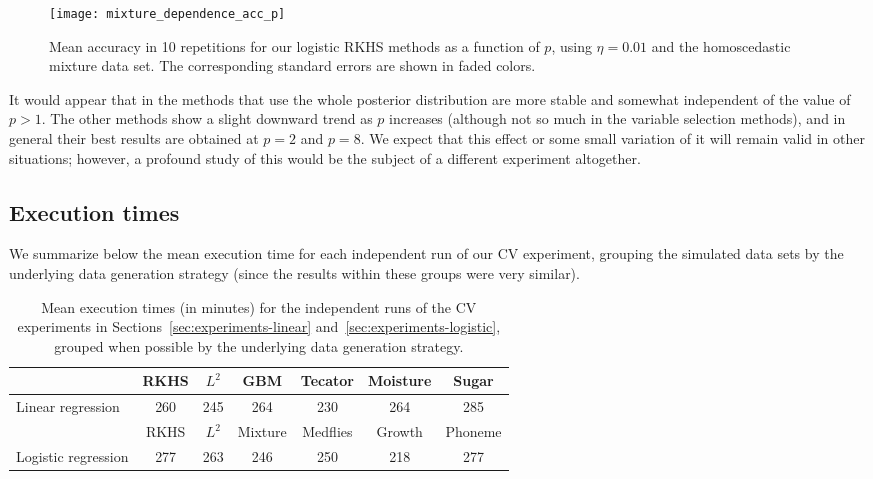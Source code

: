 \begin{figure}[ht!]
  \centering
  \texttt{[image: mixture\_dependence\_acc\_p]}
  \caption{Mean accuracy in 10 repetitions for our logistic RKHS methods as a function of \(p\), using \(\eta=0.01\) and the homoscedastic mixture data set. The corresponding standard errors are shown in faded colors.}\label{fig:dependence_acc_p}
\end{figure}

It would appear that in the methods that use the whole posterior distribution are more stable and somewhat independent of the value of \(p>1\). The other methods show a slight downward trend as \(p\) increases (although not so much in the variable selection methods), and in general their best results are obtained at \(p=2\) and \(p=8\). We expect that this effect or some small variation of it will remain valid in other situations; however, a profound study of this would be the subject of a different experiment altogether.

\subsection*{Execution times}

We summarize below the mean execution time for each independent run of our CV experiment, grouping the simulated data sets by the underlying data generation strategy (since the results within these groups were very similar).

\begin{table}[ht!]
  \centering
  \begin{tabular}{lcccccc}
\toprule
  &            RKHS &           \(L^2\) &           GBM &        Tecator & Moisture & Sugar \\
\midrule
Linear regression & 260 & 245 & 264 & 230 & 264 & 285\\
\bottomrule

  &            RKHS &           \(L^2\) &           Mixture &        Medflies & Growth & Phoneme \\
\toprule
Logistic regression & 277 & 263 & 246 & 250 & 218 & 277\\
\bottomrule
\end{tabular}
  \caption{Mean execution times (in minutes) for the independent runs of the CV experiments in Sections~\ref{sec:experiments-linear} and~\ref{sec:experiments-logistic}, grouped when possible by the underlying data generation strategy.}
\end{table}


